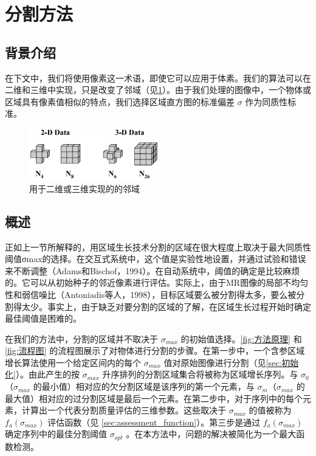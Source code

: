 \section{分割方法}\label{sec:segmentation_method}

\subsection{背景介绍}

在下文中，我们将使用像素这一术语，即使它可以应用于体素。我们的算法可以在二维和三维中实现，只是改变了邻域（见\cref{fig:邻域}）。由于我们处理的图像中，一个物体或区域具有像素值相似的特点，我们选择区域直方图的标准偏差 $\sigma$ 作为同质性标准。

\begin{figure}[htbp]
    \centering
    \includegraphics[width=0.5\textwidth]{figures/邻域.png}
    \caption{用于二维或三维实现的的邻域}
    \label{fig:邻域}
\end{figure}

\subsection{概述}

正如上一节所解释的，用区域生长技术分割的区域在很大程度上取决于最大同质性阈值σmax的选择。在交互式系统中，这个值是实验性地设置，并通过试验和错误来不断调整（Adams和Bischof，1994\cite{adams1994seeded}）。在自动系统中，阈值的确定是比较麻烦的。它可以从初始种子的邻近像素进行评估。实际上，由于MR图像的局部不均匀性和弱信噪比（Antoniadis等人，1998\cite{antoniadis1998bone}），目标区域要么被分割得太多，要么被分割得太少。事实上，由于缺乏对要分割的区域的了解，在区域生长过程开始时确定最佳阈值是困难的。

在我们的方法中，分割的区域并不取决于 $\sigma_{max}$ 的初始值选择。\cref{fig:方法原理} 和 \cref{fig:流程图} 的流程图展示了对物体进行分割的步骤。在第一步中，一个含参区域增长算法使用一个给定区间内的每个 $\sigma_{max}$ 值对原始图像进行分割（见\cref{sec:初始化}）。由此产生的按 $\sigma_{max}$ 升序排列的分割区域集合将被称为区域增长序列。与 $\sigma_{0}$（$\sigma_{max}$ 的最小值）相对应的欠分割区域是该序列的第一个元素，与 $\sigma_{m}$（$\sigma_{max}$ 的最大值）相对应的过分割区域是最后一个元素。在第二步中，对于序列中的每个元素，计算出一个代表分割质量评估的三维参数。这些取决于 $\sigma_{max}$ 的值被称为 $f_{a}(\sigma_{max})$ 评估函数（见 \cref{sec:assessment_function}）。第三步是通过 $f_{a}(\sigma_{max})$ 确定序列中的最佳分割阈值 $\sigma_{opt}$ 。在本方法中，问题的解决被简化为一个最大函数检测。

